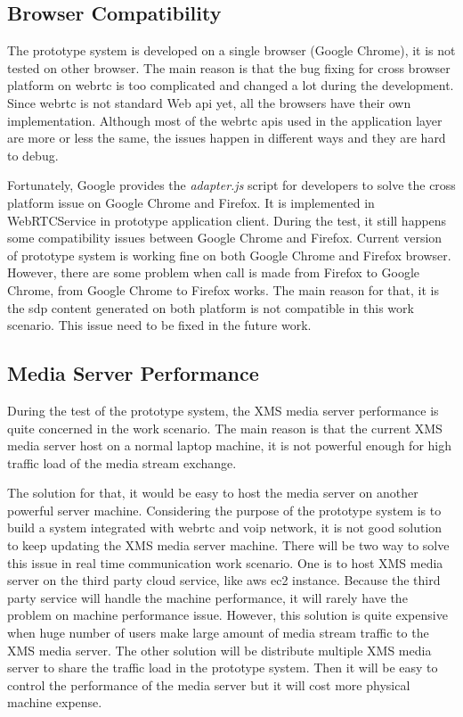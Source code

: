 \subsection{Browser Compatibility}

\par The prototype system is developed on a single browser (Google Chrome), it is not tested on other browser. The main reason is that the bug fixing for cross browser platform on \gls{webrtc} is too complicated and changed a lot during the development. Since \gls{webrtc} is not standard Web \gls{api} yet, all the browsers have their own implementation. Although most of the \gls{webrtc} \gls{api}s used in the application layer are more or less the same, the issues happen in different ways and they are hard to debug.

\par Fortunately, Google provides the \textit{adapter.js} script for developers to solve the cross platform issue on Google Chrome and Firefox. It is implemented in WebRTCService in prototype application client. During the test, it still happens some compatibility issues between Google Chrome and Firefox. Current version of prototype system is working fine on both Google Chrome and Firefox browser. However, there are some problem when call is made from Firefox to Google Chrome, from Google Chrome to Firefox works. The main reason for that, it is the \gls{sdp} content generated on both platform is not compatible in this work scenario. This issue need to be fixed in the future work.

\subsection{Media Server Performance}

\par During the test of the prototype system, the XMS media server performance is quite concerned in the work scenario. The main reason is that the current XMS media server host on a normal laptop machine, it is not powerful enough for high traffic load of the media stream exchange.

\par The solution for that, it would be easy to host the media server on another powerful server machine. Considering the purpose of the prototype system is to build a system integrated with \gls{webrtc} and \gls{voip} network, it is not good solution to keep updating the XMS media server machine. There will be two way to solve this issue in real time communication work scenario. One is to host XMS media server on the third party cloud service, like \gls{aws} \gls{ec2} instance. Because the third party service will handle the machine performance, it will rarely have the problem on machine performance issue. However, this solution is quite expensive when huge number of users make large amount of media stream traffic to the XMS media server. The other solution will be distribute multiple XMS media server to share the traffic load in the prototype system. Then it will be easy to control the performance of the media server but it will cost more physical machine expense.

